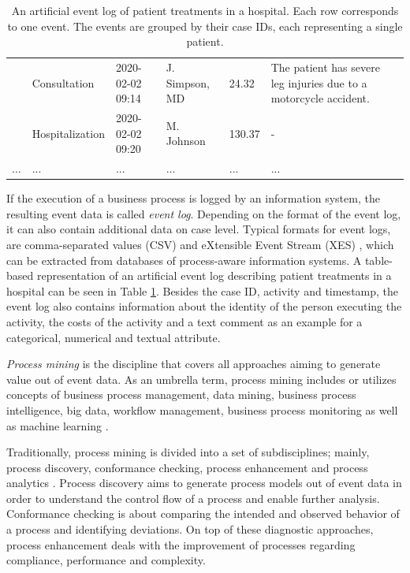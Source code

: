 \begin{table}[htbp!]
\begin{tabularx}{\textwidth}{lllllp{4.7cm}l}
		& Consultation               & 2020-02-02 09:14   & J. Simpson, MD  & 24.32         & The patient has severe leg injuries due to a motorcycle accident.  \\
		& Hospitalization       & 2020-02-02 09:20   & M. Johnson      & 130.37        & -     \\
		...              & ...                        & ...                & ...               & ...           & ...     \\ \bottomrule
	\end{tabularx}
	\caption[Artificial event log of patient treatments in a hospital]{An artificial event log of patient treatments in a hospital. Each row corresponds to one event. The events are grouped by their case IDs, each representing a single patient.}
	\label{tab:event-log}
\end{table}

If the execution of a business process is logged by an information system, the resulting event data is called \textit{event log}.
Depending on the format of the event log, it can also contain additional data on case level.
Typical formats for event logs, are comma-separated values (CSV) and eXtensible Event Stream (XES) \cite{DBLP:conf/caise/VerbeekBDA10a}, which can be extracted from databases of process-aware information systems.
A table-based representation of an artificial event log describing patient treatments in a hospital can be seen in Table \ref{tab:event-log}.
Besides the case ID, activity and timestamp, the event log also contains information about the identity of the person executing the activity, the costs of the activity and a text comment as an example for a categorical, numerical and textual attribute.

\textit{Process mining} is the discipline that covers all approaches aiming to generate value out of event data.
As an umbrella term, process mining includes or utilizes concepts of business process management, data mining, business process intelligence, big data, workflow management, business process monitoring \cite{DBLP:books/sp/Aalst16} as well as machine learning \cite{DBLP:conf/bpm/VeitGMHT17}.

Traditionally, process mining is divided into a set of subdisciplines; mainly, process discovery, conformance checking, process enhancement and process analytics \cite{DBLP:conf/caise/EckLLA15}.
Process discovery aims to generate process models out of event data in order to understand the control flow of a process and enable further analysis.
Conformance checking is about comparing the intended and observed behavior of a process and identifying deviations.
On top of these diagnostic approaches, process enhancement deals with the improvement of processes regarding compliance, performance and complexity.

